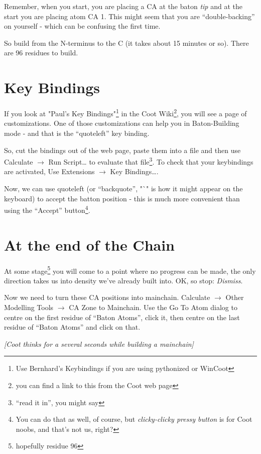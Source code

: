 \documentclass{article}
\begin{document}
Remember, when you start, you are placing a CA at the baton
\emph{tip} and at the start you are placing atom CA 1.  This might
seem that you are ``double-backing'' on yourself - which can be
confusing the first time.

So build from the N-terminus to the C (it takes about 15 minutes or
so).  There are 96 residues to build.

\section{Key Bindings}

If you look at "Paul's Key Bindings"\footnote{Use Bernhard's
  Keybindings if you are using pythonized or WinCoot} in
the Coot Wiki\footnote{you can find a link to this from the Coot web
  page}, you will see a page of customizations.  One of those
customizations can help you in Baton-Building mode - and that is the
``quoteleft'' key binding.

So, cut the bindings out of the web page, paste them into a file and
then use \textsf{Calculate $\rightarrow$ Run Script\ldots} to evaluate
that file\footnote{``read it in'', you might say}.  To check that your
keybindings are activated, Use \textsf{Extensions $\rightarrow$ Key
  Bindings\ldots}.

Now, we can use quoteleft (or ``backquote'', "`" is how it might
appear on the keyboard) to accept the batton position - this is much
more convenient than using the ``Accept'' button\footnote{You can do
  that as well, of course, but \emph{clicky-clicky pressy button} is for
Coot noobs, and that's not us, right?}.


\section{At the end of the Chain} 

At some stage\footnote{hopefully residue 96} you will come to a point
where no progress can be made, the only direction takes us into
density we've already built into.  OK, so stop: \textsl{Dismiss}.

Now we need to turn these CA positions into mainchain.
\textsf{Calculate $\rightarrow$ Other Modelling Tools $\rightarrow$ CA
  Zone to Mainchain}.  Use the \textsf{Go To Atom} dialog to centre on the
first residue of ``Baton Atoms'', click it, then centre on the last
residue of ``Baton Atoms'' and click on that.

\textsl{  [Coot thinks for a several seconds while building a mainchain]}
\end{document}
